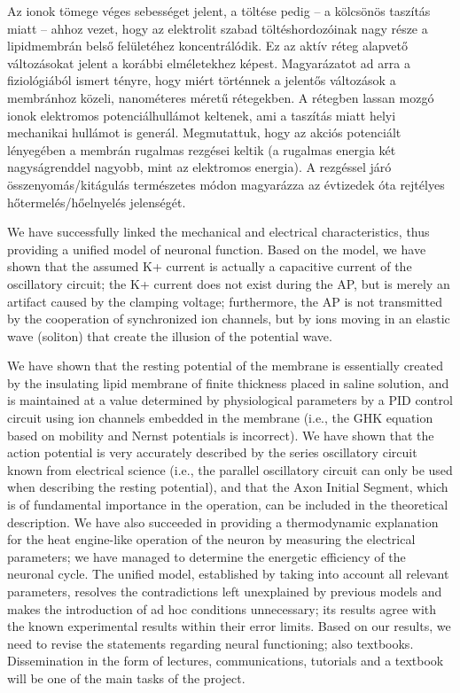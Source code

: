 {{Az ionok tömege véges sebességet jelent, a töltése pedig – a kölcsönös taszítás miatt – ahhoz vezet, hogy az elektrolit szabad töltéshordozóinak nagy része a lipidmembrán belső felületéhez koncentrálódik. Ez az aktív réteg alapvető változásokat jelent a korábbi elméletekhez képest. Magyarázatot ad arra a fiziológiából ismert tényre, hogy miért történnek a jelentős változások a membránhoz közeli, nanométeres méretű rétegekben. A rétegben lassan mozgó ionok elektromos potenciálhullámot keltenek, ami a taszítás miatt helyi mechanikai hullámot is generál. Megmutattuk, hogy az akciós potenciált lényegében a membrán rugalmas rezgései keltik (a rugalmas energia két nagyságrenddel nagyobb, mint az elektromos energia). A rezgéssel járó összenyomás/kitágulás természetes módon magyarázza az évtizedek óta rejtélyes hőtermelés/hőelnyelés jelenségét.
\fi

\ifx\magyar\undefined
We have successfully linked the mechanical and electrical characteristics, thus providing a unified model of neuronal function. Based on the model, we have shown that the assumed K+ current is actually a capacitive current of the oscillatory circuit; the K+ current does not exist during the AP, but is merely an artifact caused by the clamping voltage; furthermore, the AP is not transmitted by the cooperation of synchronized ion channels, but by ions moving in an elastic wave (soliton) that create the illusion of the potential wave.

We have shown that the resting potential of the membrane is essentially created by the insulating lipid membrane of finite thickness placed in saline solution, and is maintained at a value determined by physiological parameters by a PID control circuit using ion channels embedded in the membrane (i.e., the GHK equation based on mobility and Nernst potentials is incorrect). We have shown that the action potential is very accurately described by the series oscillatory circuit known from electrical science (i.e., the parallel oscillatory circuit can only be used when describing the resting potential), and that the Axon Initial Segment, which is of fundamental importance in the operation, can be included in the theoretical description.
We have also succeeded in providing a thermodynamic explanation for the heat engine-like operation of the neuron by measuring the electrical parameters; we have managed to determine the energetic efficiency of the neuronal cycle. The unified model, established by taking into account all relevant parameters, resolves the contradictions left unexplained by previous models and makes the introduction of ad hoc conditions unnecessary; its results agree with the known experimental results within their error limits. Based on our results, we need to revise the statements regarding neural functioning; also textbooks. Dissemination in the form of lectures, communications, tutorials and a textbook will be one of the main tasks of the project.

}}
